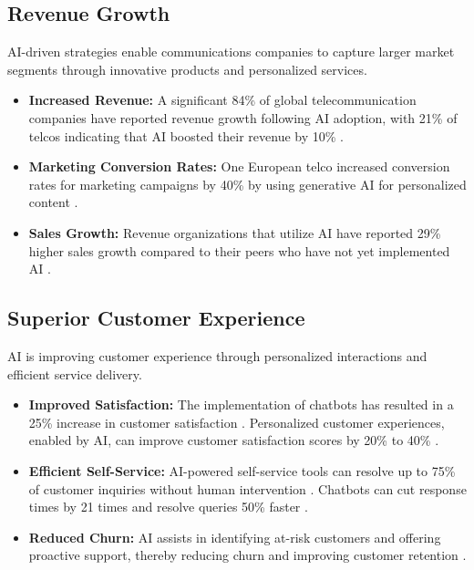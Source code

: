 \subsection{Revenue Growth}
AI-driven strategies enable communications companies to capture larger market segments through innovative products and personalized services.
\begin{itemize}
    \item \textbf{Increased Revenue:} A significant 84\% of global telecommunication companies have reported revenue growth following AI adoption, with 21\% of telcos indicating that AI boosted their revenue by 10\% \cite{ADLittle_Benefits}.
    \item \textbf{Marketing Conversion Rates:} One European telco increased conversion rates for marketing campaigns by 40\% by using generative AI for personalized content \cite{McKinsey_Benefits}.
    \item \textbf{Sales Growth:} Revenue organizations that utilize AI have reported 29\% higher sales growth compared to their peers who have not yet implemented AI \cite{PRNewswire_Benefits}.
\end{itemize}

\subsection{Superior Customer Experience}
AI is improving customer experience through personalized interactions and efficient service delivery.
\begin{itemize}
    \item \textbf{Improved Satisfaction:} The implementation of chatbots has resulted in a 25\% increase in customer satisfaction \cite{Veritis_Benefits}. Personalized customer experiences, enabled by AI, can improve customer satisfaction scores by 20\% to 40\% \cite{IBM_CustomerExp}.
    \item \textbf{Efficient Self-Service:} AI-powered self-service tools can resolve up to 75\% of customer inquiries without human intervention \cite{CSGI_CustomerExp}. Chatbots can cut response times by 21 times and resolve queries 50\% faster \cite{CSGI_CustomerExp}.
    \item \textbf{Reduced Churn:} AI assists in identifying at-risk customers and offering proactive support, thereby reducing churn and improving customer retention \cite{ADLittle_Benefits}.
\end{itemize}

